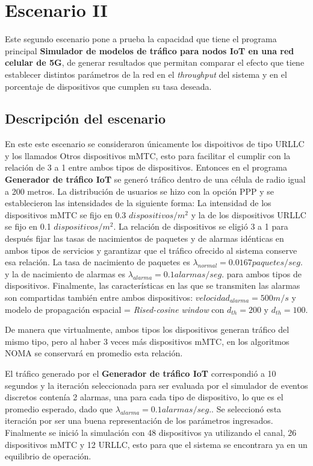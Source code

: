 \section{Escenario II} %

Este segundo escenario pone a prueba la capacidad que tiene el programa principal \textbf{Simulador de modelos de tráfico para nodos IoT en una red celular de 5G}, de generar resultados que permitan comparar el efecto que tiene establecer distintos parámetros de la red en el \textit{throughput} del sistema y en el porcentaje de dispositivos que cumplen su tasa deseada. \newline

\subsection{Descripción del escenario}

En este este escenario se consideraron únicamente los dispoitivos de tipo URLLC y los llamados Otros dispositivos mMTC, esto para facilitar el cumplir con la relación de 3 a 1 entre ambos tipos de dispositivos. Entonces en el programa \textbf{Generador de tráfico IoT} se generó tráfico dentro de una célula de radio igual a 200 metros. La distribución de usuarios se hizo con la opción PPP y se establecieron las intensidades de la siguiente forma: La intensidad de los dispositivos mMTC se fijo en 0.3 $dispositivos/m^2$ y la de los dispositivos URLLC se fijo en 0.1 $dispositivos/m^2$. La relación de dispositivos se eligió 3 a 1 para después fijar las tasas de nacimientos de paquetes y de alarmas idénticas en ambos tipos de servicios y garantizar que el tráfico ofrecido al sistema conserve esa relación. La tasa de nacimiento de paquetes es $\lambda_{normal} = 0.0167 paquetes/seg.$ y la de nacimiento de alarmas es $\lambda_{alarma} = 0.1 alarmas/seg.$ para ambos tipos de dispositivos. Finalmente, las características en las que se transmiten las alarmas son compartidas también entre ambos dispositivos: $velocidad_{alarma} = 500 m/s$ y modelo de propagación espacial = \textit{Rised-cosine window} con $d_{th}=200$ y $d_{th}=100$. \newline

De manera que virtualmente, ambos tipos los dispositivos generan tráfico del mismo tipo, pero al haber 3 veces más dispositivos mMTC, en los algoritmos NOMA se conservará en promedio esta relación.

El tráfico generado por el \textbf{Generador de tráfico IoT} correspondió a 10 segundos y la iteración seleccionada para ser evaluada por el simulador de eventos discretos contenía 2 alarmas, una para cada tipo de dispositivo, lo que es el promedio esperado, dado que $\lambda_{alarma} = 0.1 alarmas/seg.$. Se seleccionó esta iteración por ser una buena representación de los parámetros ingresados. Finalmente se inició la simulación con 48 dispositivos ya utilizando el canal, 26 dispositivos mMTC y 12 URLLC, esto para que el sistema se encontrara ya en un equilibrio de operación.

